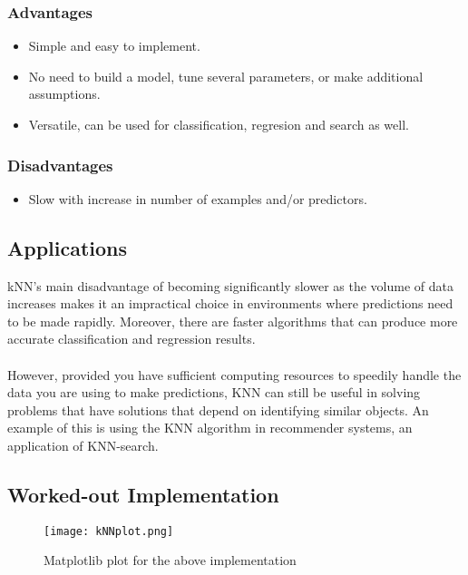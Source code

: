     \subsubsection{Advantages}
    \begin{itemize}
        \item Simple and easy to implement.
        \item No need to build a model, tune several parameters, or make additional assumptions.
        \item Versatile, can be used for classification, regresion and search as well.
    \end{itemize}

    \subsubsection{Disadvantages}
    \begin{itemize}
        \item Slow with increase in number of examples and/or predictors.
    \end{itemize}
    
\subsection{Applications}
    kNN’s main disadvantage of becoming significantly slower as the volume of data increases makes it an impractical choice in environments where predictions need to be made rapidly. Moreover, there are faster algorithms that can produce more accurate classification and regression results.\\ \\
    However, provided you have sufficient computing resources to speedily handle the data you are using to make predictions, KNN can still be useful in solving problems that have solutions that depend on identifying similar objects. An example of this is using the KNN algorithm in recommender systems, an application of KNN-search.

\subsection{Worked-out Implementation}
% 

\begin{figure}[h]
    \centering
    \texttt{[image: kNNplot.png]}
    \caption{Matplotlib plot for the above implementation}
\end{figure}
